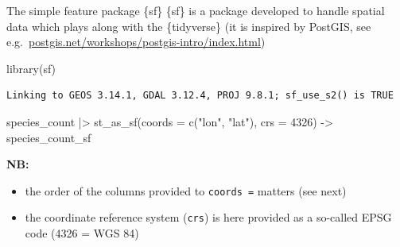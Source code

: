 \documentclass[
  ignorenonframetext,
  aspectratio=169,
]{beamer}
\newenvironment{Shaded}{\begin{snugshade}}{\end{snugshade}}
\newcommand{\AttributeTok}[1]{\textcolor[rgb]{0.40,0.45,0.13}{#1}}
\newcommand{\DecValTok}[1]{\textcolor[rgb]{0.68,0.00,0.00}{#1}}
\newcommand{\FunctionTok}[1]{\textcolor[rgb]{0.28,0.35,0.67}{#1}}
\newcommand{\NormalTok}[1]{\textcolor[rgb]{0.00,0.23,0.31}{#1}}
\newcommand{\OtherTok}[1]{\textcolor[rgb]{0.00,0.23,0.31}{#1}}
\newcommand{\SpecialCharTok}[1]{\textcolor[rgb]{0.37,0.37,0.37}{#1}}
\newcommand{\StringTok}[1]{\textcolor[rgb]{0.13,0.47,0.30}{#1}}
\providecommand{\tightlist}{%
  \setlength{\itemsep}{0pt}\setlength{\parskip}{0pt}}
\let\oldtexttt\texttt
\renewcommand{\texttt}[1]{\colorbox{gray!20}{\oldtexttt{#1}}}
\begin{document}
\begin{frame}[fragile]{The simple feature package \{sf\}}
\protect{}\label{the-simple-feature-package-sf}
\{sf\} is a package developed to handle spatial data which plays along
with the \{tidyverse\} (it is inspired by PostGIS, see
e.g.~\href{https://postgis.net/workshops/postgis-intro/index.html}{postgis.net/workshops/postgis-intro/index.html})

\footnotesize

\begin{Shaded}
\begin{Highlighting}[]
\FunctionTok{library}\NormalTok{(sf)}
\end{Highlighting}
\end{Shaded}

\begin{verbatim}
Linking to GEOS 3.14.1, GDAL 3.12.4, PROJ 9.8.1; sf_use_s2() is TRUE
\end{verbatim}

\begin{Shaded}
\begin{Highlighting}[]
\NormalTok{species\_count }\SpecialCharTok{|\textgreater{}} 
    \FunctionTok{st\_as\_sf}\NormalTok{(}\AttributeTok{coords =} \FunctionTok{c}\NormalTok{(}\StringTok{"lon"}\NormalTok{, }\StringTok{"lat"}\NormalTok{), }\AttributeTok{crs =} \DecValTok{4326}\NormalTok{) }\OtherTok{{-}\textgreater{}}\NormalTok{ species\_count\_sf}
\end{Highlighting}
\end{Shaded}

\normalsize

\textbf{NB:}

\begin{itemize}
\tightlist
\item
  the order of the columns provided to \texttt{coords\ =} matters (see
  next)
\item
  the coordinate reference system (\texttt{crs}) is here provided as a
  so-called EPSG code (4326 = WGS 84)
\end{itemize}
\end{frame}
\end{document}
